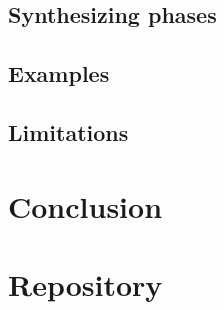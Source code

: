 \documentclass[a4paper, 11pt, fleqn]{scrreprt}
\begin{document}
\section{Synthesizing phases}
\section{Examples}
\section{Limitations}

\chapter{Conclusion}




\appendix
\chapter{Repository}
\end{document}
